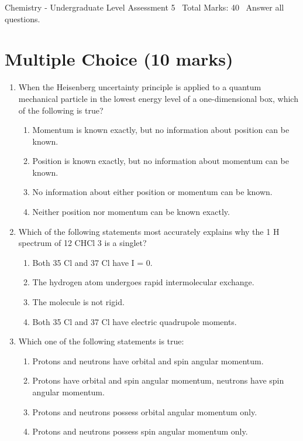 \documentclass[12pt]{article}
\begin{document}
\begin{center}
Chemistry - Undergraduate Level Assessment 5 \
Total Marks: 40 \
Answer all questions.
\end{center}

\section*{Multiple Choice (10 marks)}
\begin{enumerate}[label=\arabic*.]
\item When the Heisenberg uncertainty principle is applied to a quantum mechanical particle in the lowest energy level of a one-dimensional box, which of the following is true?
\begin{enumerate}[label=(\alph*)]
    \item Momentum is known exactly, but no information about position can be known.
    \item Position is known exactly, but no information about momentum can be known.
    \item No information about either position or momentum can be known.
    \item Neither position nor momentum can be known exactly.
\end{enumerate}
\item Which of the following statements most accurately explains why the 1 H spectrum of 12 CHCl 3 is a singlet?
\begin{enumerate}[label=(\alph*)]
    \item Both 35 Cl and 37 Cl have I = 0.
    \item The hydrogen atom undergoes rapid intermolecular exchange.
    \item The molecule is not rigid.
    \item Both 35 Cl and 37 Cl have electric quadrupole moments.
\end{enumerate}
\item Which one of the following statements is true:
\begin{enumerate}[label=(\alph*)]
    \item Protons and neutrons have orbital and spin angular momentum.
    \item Protons have orbital and spin angular momentum, neutrons have spin angular momentum.
    \item Protons and neutrons possess orbital angular momentum only.
    \item Protons and neutrons possess spin angular momentum only.

\end{enumerate}
\end{enumerate}
\end{document}
